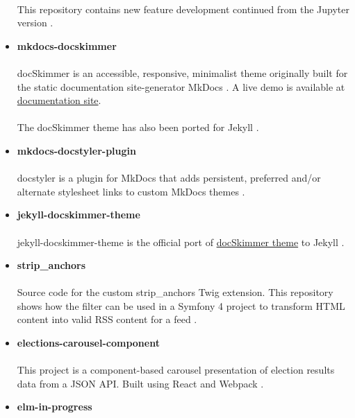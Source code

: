 \documentclass[11pt]{article}
\begin{document}
\begin{itemize}
 \paragraph{}
This repository contains new feature development continued from the Jupyter version \cite{jupyter}.
\item \textbf{mkdocs-docskimmer}
\paragraph{}
docSkimmer is an accessible, responsive, minimalist theme originally built for the static documentation site-generator MkDocs \cite{mkdocs-docskimmer}. A live demo is available at \href{http://bitsof.bytesofdesign.com/mkdocs-docskimmer/}{documentation site}.
\paragraph{}
The docSkimmer theme has also been ported for Jekyll \cite{jekyll-docskimmer}.
\item \textbf{mkdocs-docstyler-plugin}
\paragraph{}
docstyler is a plugin for MkDocs that adds persistent, preferred
and/or alternate stylesheet links to custom MkDocs themes \cite{mkdocs-docstyler-plugin}.
\item \textbf{jekyll-docskimmer-theme}
 \paragraph{}
jekyll-docskimmer-theme is the official port of \href{https://github.com/hfagerlund/mkdocs-docskimmer}{docSkimmer theme} to Jekyll \cite{jekyll-docskimmer}.
\item \textbf{strip\_anchors}
\paragraph{}
Source code for the custom strip\_anchors Twig extension. This repository shows how the filter can be used in a Symfony 4 project to transform HTML content into valid RSS content for a feed \cite{stripanchors}.
\item \textbf{elections-carousel-component}
\paragraph{}
This project is a component-based carousel presentation of election results data from a JSON API. Built using React and Webpack \cite{elections-carousel-component}.
\item \textbf{elm-in-progress}

\end{itemize}
\end{document}
